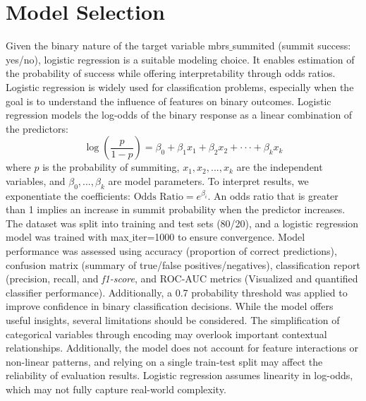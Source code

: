 \documentclass[stu,12pt,floatsintext]{apa7}
\begin{document}
\pagebreak

\section{Model Selection}
Given the binary nature of the target variable mbrs$\_$summited (summit success: yes/no), logistic regression is a suitable modeling choice. It enables estimation of the probability of success while offering interpretability through odds ratios. Logistic regression is widely used for classification problems, especially when the goal is to understand the influence of features on binary outcomes.
Logistic regression models the log-odds of the binary response as a linear combination of the predictors: $$\log{\left(\frac{p}{1-p}\right)} = \beta_0 + \beta_1 x_1 + \beta_2 x_2 + \cdot \cdot \cdot + \beta_k x_k$$ where $p$ is the probability of summiting, $x_1, x_2, ..., x_k$ are the independent variables, and $\beta_0, ..., \beta_k$ are model parameters. To interpret results, we exponentiate the coefficients: $\text{Odds Ratio} = e^{\beta_i}$. An odds ratio that is greater than 1 implies an increase in summit probability when the predictor increases.
The dataset was split into training and test sets (80/20), and a logistic regression model was trained with max$\_$iter=1000 to ensure convergence. Model performance was assessed using accuracy (proportion of correct predictions), confusion matrix (summary of true/false positives/negatives), classification report (precision, recall, and \emph{f1-score}, and ROC-AUC metrics (Visualized and quantified classifier performance). Additionally, a 0.7 probability threshold was applied to improve confidence in binary classification decisions.
While the model offers useful insights, several limitations should be considered. The simplification of categorical variables through encoding may overlook important contextual relationships. Additionally, the model does not account for feature interactions or non-linear patterns, and relying on a single train-test split may affect the reliability of evaluation results. Logistic regression assumes linearity in log-odds, which may not fully capture real-world complexity.
\end{document}
